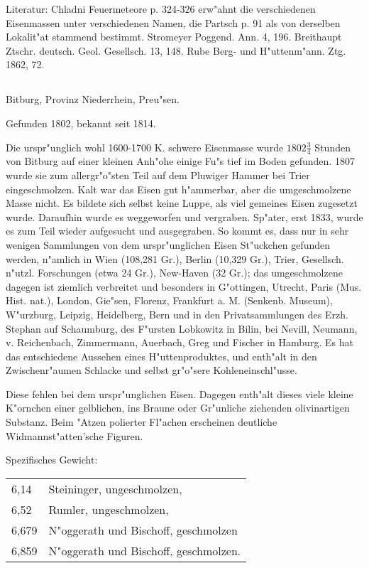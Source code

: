 \documentclass[a4paper, 11pt, oneside]{article}
\begin{document}
\normalsize
Literatur: Chladni Feuermeteore p. 324-326 erw"ahnt die verschiedenen Eisenmassen unter verschiedenen Namen, die Partsch p. 91 als von derselben Lokalit"at stammend bestimmt. Stromeyer Poggend. Ann. 4, 196. Breithaupt Ztschr. deutsch. Geol. Gesellsch. 13, 148. Rube Berg- und H"uttenm"ann. Ztg. 1862, 72.

\subsection{}
\LARGE
\paragraph{}
Bitburg, Provinz Niederrhein, Preu"sen.

Gefunden 1802, bekannt seit 1814.

Die urspr"unglich wohl 1600-1700 K. schwere Eisenmasse wurde $1802\frac{3}{4}$ Stunden von Bitburg auf einer kleinen Anh"ohe einige Fu"s tief im Boden gefunden. 1807 wurde sie zum allergr"o"sten Teil auf dem Pluwiger Hammer bei Trier eingeschmolzen. Kalt war das Eisen gut h"ammerbar, aber die umgeschmolzene Masse nicht. Es bildete sich selbst keine Luppe, als viel gemeines Eisen zugesetzt wurde. Daraufhin wurde es weggeworfen und vergraben. Sp"ater, erst 1833, wurde es zum Teil wieder aufgesucht und ausgegraben. So kommt es, dass nur in sehr wenigen Sammlungen von dem urspr"unglichen Eisen St"uckchen gefunden werden, n"amlich in Wien (108,281 Gr.), Berlin (10,329 Gr.), Trier, Gesellsch. n"utzl. Forschungen (etwa 24 Gr.), New-Haven (32 Gr.); das umgeschmolzene dagegen ist ziemlich verbreitet und besonders in G"ottingen, Utrecht, Paris (Mus. Hist. nat.), London, Gie"sen, Florenz, Frankfurt a. M. (Senkenb. Museum), W"urzburg, Leipzig, Heidelberg, Bern und in den Privatsammlungen des Erzh. Stephan auf Schaumburg, des F"ursten Lobkowitz in Bilin, bei Nevill, Neumann, v. Reichenbach, Zimmermann, Auerbach, Greg und Fischer in Hamburg. Es hat das entschiedene Aussehen eines H"uttenproduktes, und enth"alt in den Zwischenr"aumen Schlacke und selbst gr"o"sere Kohleneinschl"usse.

Diese fehlen bei dem urspr"unglichen Eisen. Dagegen enth"alt dieses viele kleine K"ornchen einer gelblichen, ins Braune oder Gr"unliche ziehenden olivinartigen Substanz. Beim "Atzen polierter Fl"achen erscheinen deutliche Widmannst"atten'sche Figuren.

Spezifisches Gewicht:  
\begin{table}[!ht]
    \centering\swabfamily\Large
    \begin{tabular}{l l}
        6,14 & Steininger, ungeschmolzen,\\
        6,52 & Rumler, ungeschmolzen,\\
        6,679 & N"oggerath und Bischoff, geschmolzen\\
        6,859 & N"oggerath und Bischoff, geschmolzen.
    \end{tabular}
\end{table}
\end{document}
